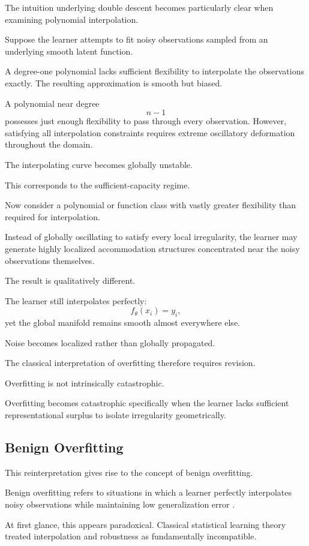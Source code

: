 \documentclass[12pt,a4paper]{article}
\begin{document}
The intuition underlying double descent becomes particularly clear when examining polynomial interpolation.

Suppose the learner attempts to fit noisy observations sampled from an underlying smooth latent function.

A degree-one polynomial lacks sufficient flexibility to interpolate the observations exactly. The resulting approximation is smooth but biased.

A polynomial near degree
\[
n-1
\]
possesses just enough flexibility to pass through every observation. However, satisfying all interpolation constraints requires extreme oscillatory deformation throughout the domain.

The interpolating curve becomes globally unstable.

This corresponds to the sufficient-capacity regime.

Now consider a polynomial or function class with vastly greater flexibility than required for interpolation.

Instead of globally oscillating to satisfy every local irregularity, the learner may generate highly localized accommodation structures concentrated near the noisy observations themselves.

The result is qualitatively different.

The learner still interpolates perfectly:
\[
f_\theta(x_i) = y_i,
\]
yet the global manifold remains smooth almost everywhere else.

Noise becomes localized rather than globally propagated.

The classical interpretation of overfitting therefore requires revision.

Overfitting is not intrinsically catastrophic.

Overfitting becomes catastrophic specifically when the learner lacks sufficient representational surplus to isolate irregularity geometrically.

\subsection{Benign Overfitting}

This reinterpretation gives rise to the concept of benign overfitting.

Benign overfitting refers to situations in which a learner perfectly interpolates noisy observations while maintaining low generalization error \cite{Bartlett2020}.

At first glance, this appears paradoxical. Classical statistical learning theory treated interpolation and robustness as fundamentally incompatible.
\end{document}
